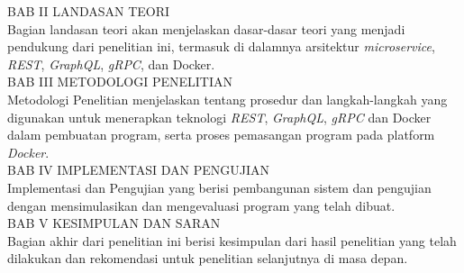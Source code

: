 BAB II	LANDASAN TEORI\\
Bagian landasan teori akan menjelaskan dasar-dasar teori yang menjadi pendukung dari penelitian ini, termasuk di dalamnya arsitektur \textit{microservice}, \textit{REST}, \textit{GraphQL}, \textit{gRPC}, dan Docker.\\

BAB III	METODOLOGI PENELITIAN\\
Metodologi Penelitian menjelaskan tentang prosedur dan langkah-langkah yang digunakan untuk menerapkan teknologi \textit{REST}, \textit{GraphQL}, \textit{gRPC} dan Docker dalam pembuatan program, serta proses pemasangan program pada platform \textit{Docker}.\\

BAB IV	IMPLEMENTASI DAN PENGUJIAN\\
Implementasi dan Pengujian yang berisi pembangunan sistem dan pengujian dengan mensimulasikan dan mengevaluasi program yang telah dibuat.\\

BAB V	KESIMPULAN DAN SARAN\\
Bagian akhir dari penelitian ini berisi kesimpulan dari hasil penelitian yang telah dilakukan dan rekomendasi untuk penelitian selanjutnya di masa depan.\\